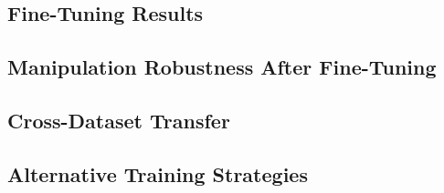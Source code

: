 \subsection{Fine-Tuning Results}
\label{sec:ft_results}


\subsection{Manipulation Robustness After Fine-Tuning}
\label{sec:ft_robustness}


\subsection{Cross-Dataset Transfer}
\label{sec:ft_transfer}


\subsection{Alternative Training Strategies}
\label{sec:ft_alternatives}

